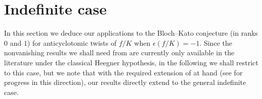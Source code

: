\documentclass[10pt,letterpaper]{amsart}
\theoremstyle{plain}
\theoremstyle{definition}
\theoremstyle{definition}
\theoremstyle{plain}
\theoremstyle{plain}
\theoremstyle{plain}
\theoremstyle{remark}
\numberwithin{equation}{section}
\newcommand{\Sel}{Sel}
\newcommand{\rH}{H}
\newcommand{\ppbar}{\bar{\mathfrak{p}}}
\def\Sel{{\rm Sel}}
\begin{document}





\section{Indefinite case}

In this section we deduce our applications to the Bloch--Kato conjecture (in ranks $0$ and $1$) for anticyclotomic twists of $f/K$ when  $\epsilon(f/K)=-1$. Since the nonvanishing results we shall need 
from \cite{hsieh} are currently only available in the literature under the classical Heegner hypothesis, in the following we shall restrict to this case, but we note that with the required extension of \cite{hsieh} at hand (see \cite{burungale-II,Magr} for progress in this direction), our results directly extend to the general indefinite case. 
\end{document}
